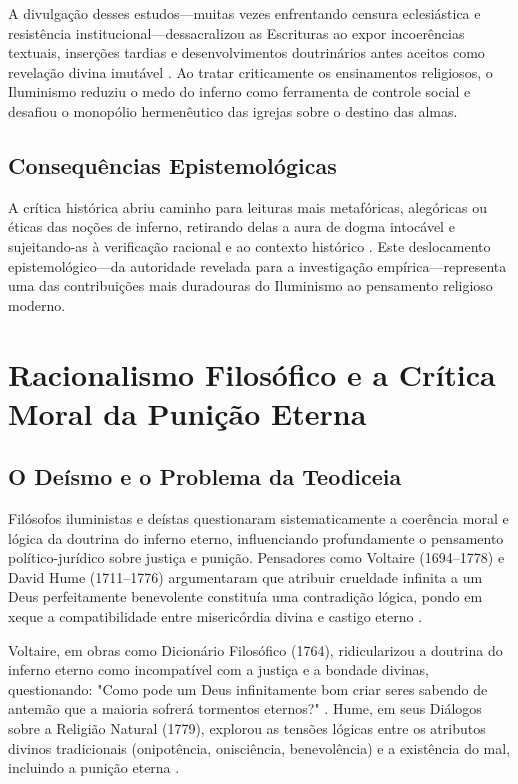 A divulgação desses estudos---muitas vezes enfrentando censura eclesiástica e resistência institucional---dessacralizou as Escrituras ao expor incoerências textuais, inserções tardias e desenvolvimentos doutrinários antes aceitos como revelação divina imutável \cite{Hazard1935}. Ao tratar criticamente os ensinamentos religiosos, o Iluminismo reduziu o medo do inferno como ferramenta de controle social e desafiou o monopólio hermenêutico das igrejas sobre o destino das almas.

\subsection{Consequências Epistemológicas}

A crítica histórica abriu caminho para leituras mais metafóricas, alegóricas ou éticas das noções de inferno, retirando delas a aura de dogma intocável e sujeitando-as à verificação racional e ao contexto histórico \cite{Reventlow1984}. Este deslocamento epistemológico---da autoridade revelada para a investigação empírica---representa uma das contribuições mais duradouras do Iluminismo ao pensamento religioso moderno.

\section{Racionalismo Filosófico e a Crítica Moral da Punição Eterna}

\subsection{O Deísmo e o Problema da Teodiceia}

Filósofos iluministas e deístas questionaram sistematicamente a coerência moral e lógica da doutrina do inferno eterno, influenciando profundamente o pensamento político-jurídico sobre justiça e punição. Pensadores como Voltaire (1694--1778) e David Hume (1711--1776) argumentaram que atribuir crueldade infinita a um Deus perfeitamente benevolente constituía uma contradição lógica, pondo em xeque a compatibilidade entre misericórdia divina e castigo eterno \cite{Voltaire1764}.

Voltaire, em obras como Dicionário Filosófico (1764), ridicularizou a doutrina do inferno eterno como incompatível com a justiça e a bondade divinas, questionando: "Como pode um Deus infinitamente bom criar seres sabendo de antemão que a maioria sofrerá tormentos eternos?" \cite{Voltaire1759}. Hume, em seus Diálogos sobre a Religião Natural (1779), explorou as tensões lógicas entre os atributos divinos tradicionais (onipotência, onisciência, benevolência) e a existência do mal, incluindo a punição eterna \cite{Hume1779}.

